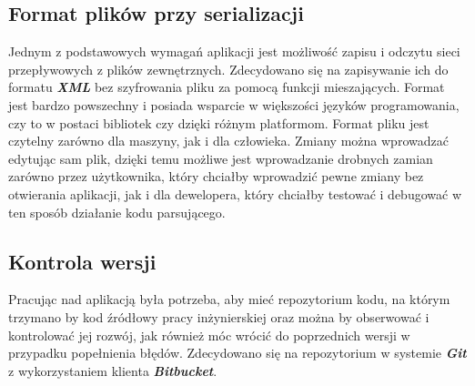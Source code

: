 \subsection{Format plików przy serializacji}
Jednym z podstawowych wymagań aplikacji jest możliwość zapisu i odczytu sieci przepływowych z plików zewnętrznych. Zdecydowano się na zapisywanie ich do formatu \textbf{\textit{XML}} bez szyfrowania pliku za pomocą funkcji mieszających. Format jest bardzo powszechny i posiada wsparcie w większości języków programowania, czy to w postaci bibliotek czy dzięki różnym platformom. Format pliku jest czytelny zarówno dla maszyny, jak i dla człowieka. Zmiany można wprowadzać edytując sam plik, dzięki temu możliwe jest wprowadzanie drobnych zamian zarówno przez użytkownika, który chciałby wprowadzić pewne zmiany bez otwierania aplikacji, jak i dla dewelopera, który chciałby testować i debugować w ten sposób działanie kodu parsującego.
\subsection{Kontrola wersji}\label{ssec:kontrolaWersji}
Pracując nad aplikacją była potrzeba, aby mieć repozytorium kodu, na którym trzymano by kod źródłowy pracy inżynierskiej oraz można by obserwować i kontrolować jej rozwój, jak również móc wrócić do poprzednich wersji w przypadku popełnienia błędów. Zdecydowano się na repozytorium w systemie \textbf{\textit{Git}} z wykorzystaniem klienta \textbf{\textit{Bitbucket}}.